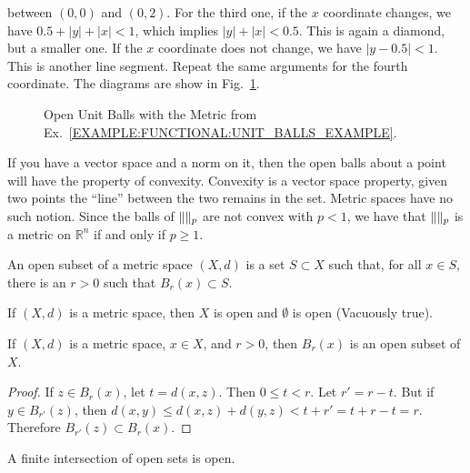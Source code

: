 \begin{example}
    between $(0,0)$ and $(0,2)$. For the third one, if
    the $x$ coordinate changes, we have
    $0.5+|y|+|x|<1$, which implies
    $|y|+|x|<0.5$. This is again a diamond, but a
    smaller one. If the $x$ coordinate does not
    change, we have $|y-0.5|<1$. This is another
    line segment. Repeat the same arguments for the
    fourth coordinate. The diagrams are show in
    Fig.~\ref{FUNCTIONAL:HOMEWORK:2:PROBLEM:4:FIGURES}.
    \begin{figure}[H]
        \centering
        \captionsetup{type=figure}
        
        \caption[Open Unit Balls with a Strange Metric]
            {Open Unit Balls with the Metric from
             Ex.~\ref{EXAMPLE:FUNCTIONAL:UNIT_BALLS_EXAMPLE}.}
        \label{FUNCTIONAL:HOMEWORK:2:PROBLEM:4:FIGURES}
    \end{figure}
    \end{example}
    If you have a vector space and a norm on it,
    then the open balls about a point will have the
    property of convexity. Convexity is a vector space
    property, given two points the ``line'' between the
    two remains in the set. Metric spaces have no such
    notion. Since the balls of $\lVert\rVert_{p}$ are not
    convex with $p<1$, we have that $\lVert\rVert_{p}$ is
    a metric on $\mathbb{R}^{n}$
    if and only if $p\geq{1}$.
    \begin{definition}
        An open subset of a metric space
        $(X,d)$ is a set $S\subset{X}$ such that,
        for all $x\in{S}$, there is an
        $r>0$ such that
        $B_{r}(x)\subset{S}$.
    \end{definition}
    \begin{example}
        If $(X,d)$ is a metric space, then
        $X$ is open and $\emptyset$ is open
        (Vacuously true).
    \end{example}
    \begin{theorem}
        If $(X,d)$ is a metric space, $x\in{X}$,
        and $r>0$, then $B_{r}(x)$ is an open
        subset of $X$.
    \end{theorem}
    \begin{proof}
        If $z\in{B_{r}(x)}$, let $t=d(x,z)$.
        Then $0\leq{t}<r$. Let $r'=r-t$.
        But if $y\in{B_{r'}(z)}$, then
        $d(x,y)\leq{d(x,z)+d(y,z)}<t+r'=t+r-t=r$.
        Therefore $B_{r'}(z)\subset{B_{r}(x)}$.
    \end{proof}
    \begin{theorem}
        A finite intersection of open sets is open.
    \end{theorem}
